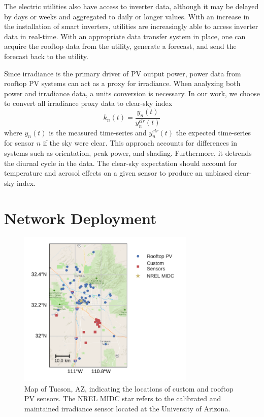 The electric utilities also have access to inverter data, although it
may be delayed by days or weeks and aggregated to daily or longer values.
With an increase in the installation of smart inverters, utilities are
increasingly able to access inverter data in real-time.
With an appropriate data transfer system in place, one can acquire
the rooftop data from the utility, generate a forecast, and send the
forecast back to the utility.

Since irradiance is the primary driver of PV output power, power data
from rooftop PV systems can act as a proxy for irradiance.
When analyzing both power and irradiance data, a units conversion is
necessary.
In our work, we choose to convert all irradiance proxy data to
clear-sky index
\begin{equation}
\label{eq:clrind}
k_n(t) = \frac{y_n(t)}{y_n^{clr}(t)}
\end{equation}
where $y_n(t)$ is the measured time-series and $y_n^{clr}(t)$ the
expected time-series for sensor $n$ if the sky were clear.
This approach accounts for differences in systems such as orientation,
peak power, and shading.
Furthermore, it detrends the diurnal cycle in the data.
The clear-sky expectation should account for temperature and aerosol
effects on a given sensor to produce an unbiased clear-sky index.

\section{Network Deployment}
\begin{figure}[h]
\centering
\includegraphics[width=0.75\textwidth]{figs/map.pdf}
\caption[Map of sensor locations]{Map of Tucson, AZ, indicating the
  locations of custom and rooftop PV sensors. The NREL MIDC star
  refers to the calibrated and maintained irradiance sensor located at
  the University of Arizona.}
\label{fig:map}
\end{figure}

